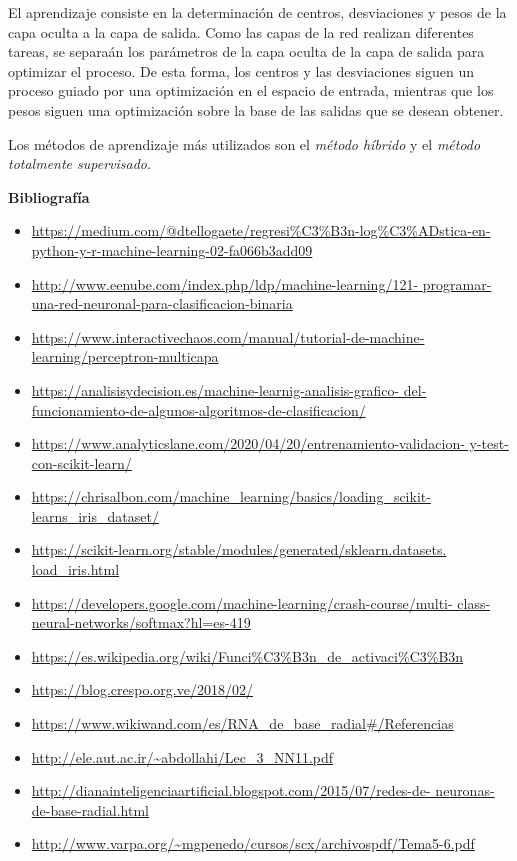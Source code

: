 \documentclass[letterpaper,11pt]{article}
\begin{document}
\begin{enumerate}
    El aprendizaje consiste en la determinación de centros, desviaciones y pesos 
    de la capa oculta a la capa de salida. Como las capas de la red realizan 
    diferentes tareas, se separaán los parámetros de la capa oculta de la capa 
    de salida para optimizar el proceso. De esta forma, los centros y las 
    desviaciones siguen un proceso guiado por una optimización en el espacio de 
    entrada, mientras que los pesos siguen una optimización sobre la base de las 
    salidas que se desean obtener. 

    Los métodos de aprendizaje más utilizados son el \textit{método híbrido} y
    el \textit{método totalmente supervisado}. 
\end{enumerate}

\textbf{Bibliografía}
\begin{itemize}
    \item \url{https://medium.com/@dtellogaete/regresi%
               python-y-r-machine-learning-02-fa066b3add09}
    \item \url{http://www.eenube.com/index.php/ldp/machine-learning/121-
               programar-una-red-neuronal-para-clasificacion-binaria}
    \item \url{https://www.interactivechaos.com/manual/tutorial-de-machine-
               learning/perceptron-multicapa}
    \item \url{https://analisisydecision.es/machine-learnig-analisis-grafico-
               del-funcionamiento-de-algunos-algoritmos-de-clasificacion/}
    \item \url{https://www.analyticslane.com/2020/04/20/entrenamiento-validacion-
               y-test-con-scikit-learn/}
    \item \url{https://chrisalbon.com/machine_learning/basics/loading_scikit-
               learns_iris_dataset/}
    \item \url{https://scikit-learn.org/stable/modules/generated/sklearn.datasets.
               load_iris.html}
    \item \url{https://developers.google.com/machine-learning/crash-course/multi-
               class-neural-networks/softmax?hl=es-419}
    \item \url{https://es.wikipedia.org/wiki/Funci%C3%B3n_de_activaci%C3%B3n}
    \item \url{https://blog.crespo.org.ve/2018/02/}
    \item \url{https://www.wikiwand.com/es/RNA_de_base_radial#/Referencias}
    \item \url{http://ele.aut.ac.ir/~abdollahi/Lec_3_NN11.pdf}
    \item \url{http://dianainteligenciaartificial.blogspot.com/2015/07/redes-de-
               neuronas-de-base-radial.html}
    \item \url{http://www.varpa.org/~mgpenedo/cursos/scx/archivospdf/Tema5-6.pdf}
\end{itemize}
\end{document}
